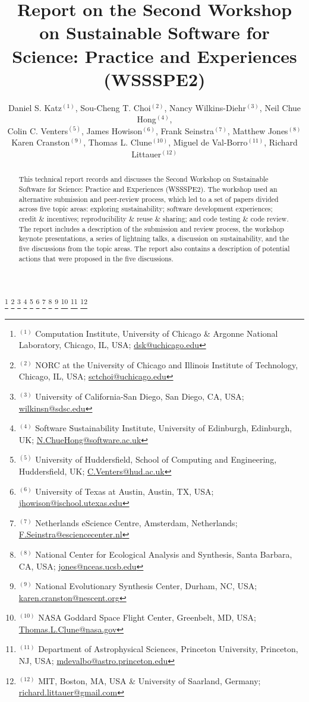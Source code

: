 \documentclass[11pt, oneside]{amsart}
\begin{document}
\title[]{Report on the Second Workshop on Sustainable Software for Science: Practice and Experiences (WSSSPE2)}

\author{Daniel S. Katz$^{(1)}$, Sou-Cheng T. Choi$^{(2)}$, Nancy Wilkins-Diehr$^{(3)}$, Neil Chue Hong$^{(4)}$,
\\Colin C. Venters$^{(5)}$, James Howison$^{(6)}$, Frank Seinstra$^{(7)}$, Matthew Jones$^{(8)}$
\\Karen Cranston$^{(9)}$, Thomas L. Clune$^{(10)}$, Miguel de Val-Borro$^{(11)}$, Richard Littauer$^{(12)}$}
%
\thanks{{}$^{(1)}$ Computation Institute, 
University of Chicago \& Argonne National Laboratory, Chicago, IL, USA; \url{dsk@uchicago.edu}}
%
\thanks{{}$^{(2)}$ NORC at the University of Chicago and Illinois Institute of Technology, Chicago, IL, USA; \url{sctchoi@uchicago.edu}}
%
\thanks{{}$^{(3)}$ University of California-San Diego, San Diego, CA, USA; \url{wilkinsn@sdsc.edu}}
%
\thanks{{}$^{(4)}$ Software Sustainability Institute, 
University of Edinburgh, Edinburgh, UK; \url{N.ChueHong@software.ac.uk}}
%
\thanks{{}$^{(5)}$ University of Huddersfield, School of Computing and Engineering, Huddersfield, UK; \url{C.Venters@hud.ac.uk}}
%
\thanks{{}$^{(6)}$ University of Texas at Austin, Austin, TX, USA; \url{jhowison@ischool.utexas.edu}}
%
\thanks{{}$^{(7)}$ Netherlands eScience Centre, Amsterdam, Netherlands; \url{F.Seinstra@esciencecenter.nl}}
%
\thanks{{}$^{(8)}$ National Center for Ecological Analysis and Synthesis, Santa Barbara, CA, USA; \url{jones@nceas.ucsb.edu}}
%
\thanks{{}$^{(9)}$ National Evolutionary Synthesis Center, Durham, NC, USA; \url{karen.cranston@nescent.org}}
%
\thanks{{}$^{(10)}$ NASA Goddard Space Flight Center, Greenbelt, MD, USA; \url{Thomas.L.Clune@nasa.gov}}
%
\thanks{{}$^{(11)}$ Department of Astrophysical Sciences, 
Princeton University, Princeton, NJ, USA; \url{mdevalbo@astro.princeton.edu}}
%
\thanks{{}$^{(12)}$ MIT, Boston, MA, USA \& University of Saarland, Germany; \url{richard.littauer@gmail.com}}
%
 

\begin{abstract}
This technical report records and discusses the Second Workshop on Sustainable
Software for Science: Practice and Experiences (WSSSPE2). The workshop used an
alternative submission and peer-review process, which led to a set of papers
divided across five topic areas: exploring sustainability; software development
experiences; credit \& incentives; reproducibility \& reuse \& sharing; and code
testing \& code review. The report includes a description of the submission and
review process, the workshop keynote presentations, a series of lightning talks,
a discussion on sustainability, and the five discussions from the topic areas.
The report also contains a description of potential actions that were proposed
in the five discussions.
\end{abstract}
\end{document}
